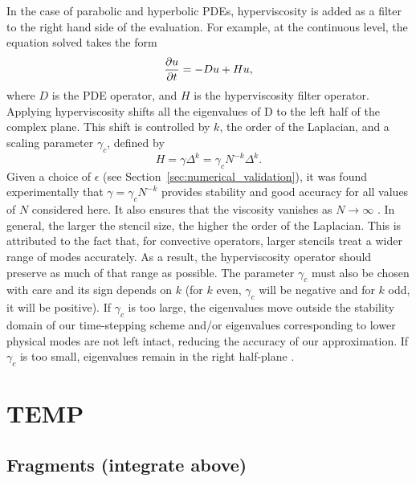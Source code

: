 \documentclass{report}
\begin{document}
{%

In the case of parabolic and hyperbolic PDEs, hyperviscosity is added as a filter to the right hand side of the evaluation. For example, at the continuous level, 
the equation solved takes the form
\begin{equation}
\frac{\partial u}{\partial t} = - D u + H u,
\label{eq:evaluation_with_hyperviscosity}
\end{equation}
where $D$ is the PDE operator, and $H$ is the hyperviscosity filter operator.
Applying hyperviscosity shifts all the eigenvalues of D to the left half of the complex plane. 
This shift is controlled by $k$, the order of the Laplacian, and a scaling parameter $\gamma_c$, defined by
\begin{equation*}	
H = \gamma \Delta^{k} = \gamma_c N^{-k} \Delta^{k}.
\end{equation*}
Given a choice of $\epsilon$ (see Section~\ref{sec:numerical_validation}), it was found experimentally that $\gamma = \gamma_c N^{-k}$  provides stability and good accuracy for all values of $N$ considered here. It also ensures that the viscosity vanishes as $N\rightarrow\infty$ \cite{FlyerLehto11}.
In general, the larger the stencil size, the higher the order of the Laplacian.  This is attributed to the fact that, for convective operators, larger stencils treat a wider range of modes accurately. As a result, the hyperviscosity operator should preserve as much of that range as possible. The parameter $\gamma_c$ must also be chosen with care and its sign depends on $k$ (for $k$ even, $\gamma_c$ will be negative and for $k$ odd, it will be positive). If $\gamma_c$ is too large, the eigenvalues move outside the stability domain of our time-stepping scheme and/or eigenvalues corresponding to lower physical modes are not left intact, reducing the accuracy of our approximation. If $\gamma_c$ is too small, eigenvalues remain in the right half-plane \cite{FornbergLehto11,FlyerLehto11}.



\chapter{TEMP}


\section{Fragments (integrate above)}

}
\end{document}
